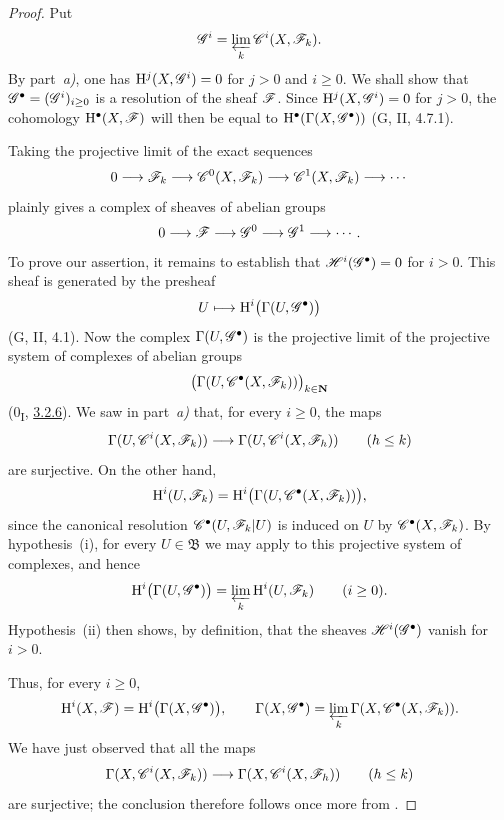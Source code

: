 \begin{proof}
Put
\[
  \mathscr{G}^i=\varprojlim_k\mathscr{C}^i(X,\mathscr{F}_k).
\]
By part~\emph{a)}, one has
$\mathrm{H}^j(X,\mathscr{G}^i)=0$ for $j>0$ and $i\geq0$.
We shall show that
$\mathscr{G}^\bullet=(\mathscr{G}^i)_{i\geq0}$ is a resolution of the sheaf
$\mathscr{F}$. Since $\mathrm{H}^j(X,\mathscr{G}^i)=0$ for $j>0$, the cohomology
$\mathrm{H}^\bullet(X,\mathscr{F})$ will then be equal to
$\mathrm{H}^\bullet(\Gamma(X,\mathscr{G}^\bullet))$ (G, II, 4.7.1).

Taking the projective limit of the exact sequences
\[
  0\longrightarrow\mathscr{F}_k
  \longrightarrow\mathscr{C}^0(X,\mathscr{F}_k)
  \longrightarrow\mathscr{C}^1(X,\mathscr{F}_k)
  \longrightarrow\cdots
\]
plainly gives a complex of sheaves of abelian groups
\[
  0\longrightarrow\mathscr{F}
  \longrightarrow\mathscr{G}^0
  \longrightarrow\mathscr{G}^1
  \longrightarrow\cdots.
\]
To prove our assertion, it remains to establish that
$\mathscr{H}^i(\mathscr{G}^\bullet)=0$ for $i>0$.
This sheaf is generated by the presheaf
\[
  U\longmapsto\mathrm{H}^i\bigl(\Gamma(U,\mathscr{G}^\bullet)\bigr)
\]
(G, II, 4.1).
Now the complex $\Gamma(U,\mathscr{G}^\bullet)$ is the projective limit of
the projective system of complexes of abelian groups
\[
  \bigl(\Gamma(U,\mathscr{C}^\bullet(X,\mathscr{F}_k))\bigr)_{k\in\mathbf{N}}
\]
(0\textsubscript{I}, \hyperref[0.3.2.6]{3.2.6}).
We saw in part~\emph{a)} that, for every $i\geq0$, the maps
\[
  \Gamma(U,\mathscr{C}^i(X,\mathscr{F}_k))
  \longrightarrow
  \Gamma(U,\mathscr{C}^i(X,\mathscr{F}_h))
  \qquad(h\leq k)
\]
are surjective. On the other hand,
\[
  \mathrm{H}^i(U,\mathscr{F}_k)
  =
  \mathrm{H}^i\bigl(\Gamma(U,\mathscr{C}^\bullet(X,\mathscr{F}_k))\bigr),
\]
since the canonical resolution $\mathscr{C}^\bullet(U,\mathscr{F}_k|U)$ is
induced on $U$ by $\mathscr{C}^\bullet(X,\mathscr{F}_k)$.
By hypothesis~{\rm(i)}, for every $U\in\mathfrak{B}$ we may apply
 to this projective system of complexes, and hence
\[
  \mathrm{H}^i\bigl(\Gamma(U,\mathscr{G}^\bullet)\bigr)
  =
  \varprojlim_k\mathrm{H}^i(U,\mathscr{F}_k)
  \qquad(i\geq0).
\]
Hypothesis~{\rm(ii)} then shows, by definition, that the sheaves
$\mathscr{H}^i(\mathscr{G}^\bullet)$ vanish for $i>0$.

Thus, for every $i\geq0$,
\[
  \mathrm{H}^i(X,\mathscr{F})
  =
  \mathrm{H}^i\bigl(\Gamma(X,\mathscr{G}^\bullet)\bigr),
  \qquad
  \Gamma(X,\mathscr{G}^\bullet)
  =
  \varprojlim_k\Gamma(X,\mathscr{C}^\bullet(X,\mathscr{F}_k)).
\]
We have just observed that all the maps
\[
  \Gamma(X,\mathscr{C}^i(X,\mathscr{F}_k))
  \longrightarrow
  \Gamma(X,\mathscr{C}^i(X,\mathscr{F}_h))
  \qquad(h\leq k)
\]
are surjective; the conclusion therefore follows once more from
.
\end{proof}

